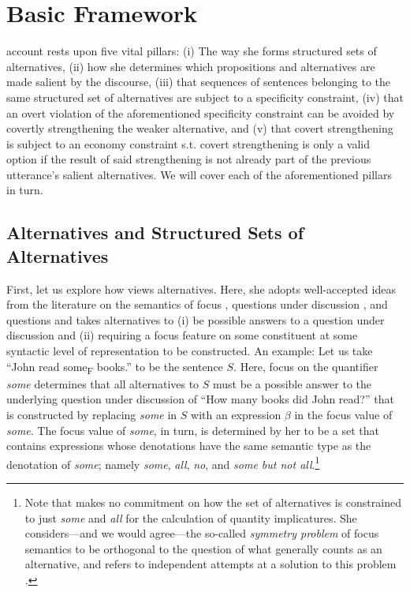 \section{Basic Framework}
 account rests upon five vital pillars: (i) The way she forms structured sets of alternatives, (ii) how she determines which propositions and alternatives are made salient by the discourse, (iii) that sequences of sentences belonging to the same structured set of alternatives are subject to a specificity constraint, (iv) that an overt violation of the aforementioned specificity constraint can be avoided by covertly strengthening the weaker alternative, and (v) that covert strengthening is subject to an economy constraint s.t. covert strengthening is only a valid option if the result of said strengthening is not already part of the previous utterance's salient alternatives. We will cover each of the aforementioned pillars in turn.

\subsection{Alternatives and Structured Sets of Alternatives}
First, let us explore how \textcite{Ippolito2020} views alternatives. Here, she adopts well-accepted ideas from the literature on the semantics of focus \parencite{Rooth1992,Rooth1996}, questions under discussion \parencite{Buring2003,Roberts1996}, and questions \parencite{Groenendijk1999} and takes alternatives to (i) be possible answers to a question under discussion and (ii) requiring a focus feature on some constituent at some syntactic level of representation to be constructed. An example: Let us take \enquote{John read some\textsubscript{F} books.} to be the sentence $S$. Here, focus on the quantifier \textit{some} determines that all alternatives to $S$ must be a possible answer to the underlying question under discussion of \enquote{How many books did John read?} that is constructed by replacing \textit{some} in $S$ with an expression $\beta$ in the focus value of \textit{some}. The focus value of \textit{some}, in turn, is determined by her to be a set that contains expressions whose denotations have the same semantic type as the denotation of \textit{some}; namely \textit{some}, \textit{all}, \textit{no}, and \textit{some but not all}.\footnote{Note that \textcite{Ippolito2020} makes no commitment on how the set of alternatives is constrained to just \textit{some} and \textit{all} for the calculation of quantity implicatures. She considers---and we would agree---the so-called \textit{symmetry problem} of focus semantics to be orthogonal to the question of what generally counts as an alternative, and refers to independent attempts at a solution to this problem \textcite[e.g.,][]{Katzir2007,Fox2011}.\label{footnote:symmetry}}

